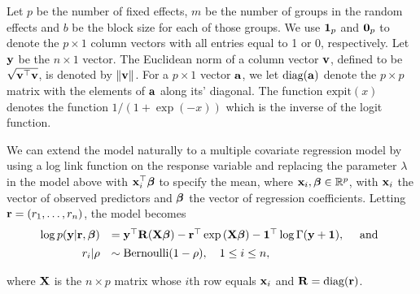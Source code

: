 Let $p$ be the number of fixed effects, $m$ be the number of groups in the
random effects and $b$ be the block size for each of those groups. We use
${\bf 1}_p$ and ${\bf 0}_p$ to denote the $p \times 1$ column vectors with all
entries equal to 1 or 0, respectively.
Let ${\bf y}$ be the $n \times 1$ vector. The Euclidean norm of a column vector
${\bf v}$, defined to be $\sqrt{{\bf v}^\top {\bf v}}$, is denoted by $\|{\bf v}\|$. For a $p
\times 1$ vector ${\bf a}$, we let $\text{diag}{({\bf a})}$ denote the $p \times p$ matrix
with the elements of ${\bf a}$ along its' diagonal.
The function $\text{expit}(x)$ denotes the function $1/(1 + \exp(-x))$ which is the
inverse of the logit function.

We can extend the model naturally to a multiple covariate regression model by
using a log link function on the response variable and replacing the parameter
$\lambda$ in the model above with ${\bf x}_i^\top {\boldsymbol\beta}$ to specify the mean,
where ${\bf x}_i,{\boldsymbol \beta} \in {\mathbb{R}}^p$, with ${\bf x}_i$ the vector of observed predictors
and ${\boldsymbol \beta}$ the vector of regression coefficients. Letting ${\bf r} =
(r_1,\ldots,r_n)$, the model becomes
\begin{equation*}%
	\begin{array}{rl}
		\log p(\vy|\vr, \vbeta) 
		    & = \vy^\top \mR (\mX\vbeta)                           
		- \vr^\top \exp{(\mX\vbeta)} 
		- \vone^\top \log{\Gamma{(\vy + \vone)}}, \quad \mbox{ and }\\ [1ex]
		r_i | \rho & \sim \text{Bernoulli}(1-\rho), \quad 1 \leq i \leq n, \\
	\end{array}
\end{equation*}

\noindent where ${\bf X}$ is the $n\times p$ matrix whose $i$th row equals ${\bf x}_i$
and ${\bf R} = \text{diag}{({\bf r})}$.

